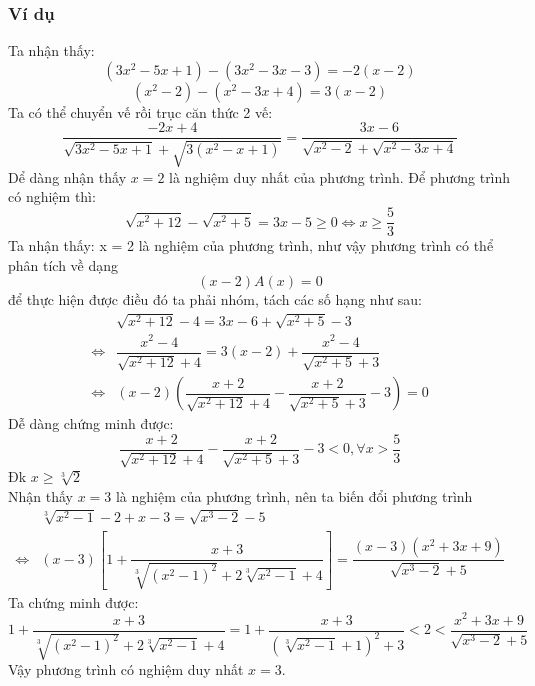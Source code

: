 \subsubsection{Ví dụ}
\hda
Ta nhận thấy:  $$\left( {3x^2 - 5x + 1} \right) - \left( {3x^2 - 3x - 3} \right) = - 2\left( {x - 2} \right)$$ 
 $$\left( {x^2 - 2} \right) - \left( {x^2 - 3x + 4} \right) = 3\left( {x - 2} \right)$$
Ta có thể chuyển vế rồi trục căn thức 2 vế:  $$\dfrac{{ - 2x + 4}}{{\sqrt {3x^2 - 5x + 1} + \sqrt {3\left( {x^2 - x + 1} \right)} }} = \dfrac{{3x - 6}}{{\sqrt {x^2 - 2} + \sqrt {x^2 - 3x + 4} }}$$
Dể dàng nhận thấy $x=2$ là nghiệm duy nhất của phương trình.
\hda
Để phương trình có nghiệm thì:  $$\sqrt {x^2 + 12} - \sqrt {x^2 + 5} = 3x - 5 \ge 0 \Leftrightarrow x \ge \dfrac{5}{3}$$
Ta nhận thấy:  x = 2 là nghiệm của phương trình, như vậy phương trình có thể phân tích về dạng 
$$\left( {x - 2} \right)A\left( x \right) = 0$$ để thực hiện được điều đó ta phải nhóm, tách các số hạng như sau: 
\begin{align*}
& \sqrt {x^2 + 12} - 4 = 3x - 6 + \sqrt {x^2 + 5} - 3\\
 \Leftrightarrow & \dfrac{{x^2 - 4}}{{\sqrt {x^2 + 12} + 4}} = 3\left( {x - 2} \right) + \dfrac{{x^2 - 4}}{{\sqrt {x^2 + 5} + 3}} \\ 
 \Leftrightarrow & \left( {x - 2} \right)\left( {\dfrac{{x + 2}}{{\sqrt {x^2 + 12} + 4}} - \dfrac{{x +2}}{{\sqrt {x^2 + 5} + 3}} - 3} \right) = 0 
\end{align*}
Dễ dàng chứng minh được:  $$\dfrac{{x + 2}}{{\sqrt {x^2 + 12} + 4}} - \dfrac{{x + 2}}{{\sqrt {x^2 + 5} + 3}} - 3 < 0, \forall x > \dfrac{5}{3}$$
\hda
 Đk $x \ge \sqrt[3]{2}$\\
Nhận thấy $x = 3$ là nghiệm của phương trình, nên ta biến đổi phương trình 
\begin{align*}
& \sqrt[3]{{x^2 - 1}} - 2 + x - 3 = \sqrt {x^3 - 2} - 5\\
 \Leftrightarrow & \left( {x - 3} \right)\left[ {1 + \dfrac{{x + 3}}{{\sqrt[3]{{\left( {x^2 - 1} \right)^2 }} + 2\sqrt[3]{{x^2 - 1}} + 4}}} \right] = \dfrac{{\left( {x - 3} \right)\left( {x^2 + 3x + 9} \right)}}{{\sqrt {x^3 - 2} + 5}}
\end{align*}
Ta chứng minh được: 
$$1 + \dfrac{{x + 3}}{{\sqrt[3]{{\left( {x^2 - 1} \right)^2 }} + 2\sqrt[3]{{x^2 - 1}} + 4}} = 1 + \dfrac{{x + 3}}{{\left( {\sqrt[3]{{x^2 - 1}} + 1} \right)^2 + 3}} < 2 < \dfrac{{x^2 + 3x + 9}}{{\sqrt {x^3 - 2} + 5}}$$
Vậy phương trình có nghiệm duy nhất $x=3$.
